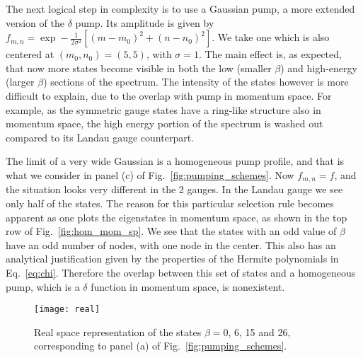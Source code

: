 \documentclass[twocolumn, 10pt, aps, superscriptaddress, floatfix, showpacs, pra, citeautoscript]{revtex4-1}
\newcommand{\co}[2]{#2}
\renewcommand{\paragraph}{\co}
\begin{document}
\paragraph{Gaussian pumping is now bound also in momentum space.}
The next logical step in complexity is to use a Gaussian pump, a more
extended version of the $\delta$ pump. Its amplitude is given by
$f_{m,n} = \exp- \frac{1}{2\sigma^2} \left[(m-m_0)^2 + (n-n_0)^2
\right]$.
We take one which is also centered at $(m_0,n_0) = (5,5)$, with
$\sigma =1$. The main effect is, as expected, that now more states
become visible in both the low (smaller $\beta$) and high-energy
(larger $\beta$) sections of the spectrum. The intensity of the states
however is more difficult to explain, due to the overlap with pump in
momentum space. For example, as the symmetric gauge states have a
ring-like structure also in momentum space, the high energy portion of
the spectrum is washed out compared to its Landau gauge counterpart.

\paragraph{Homogeneous spectrum can be understood using a parity argument in momentum space.}
The limit of a very wide Gaussian is a homogeneous pump profile, and
that is what we consider in panel (c) of
Fig.~\ref{fig:pumping_schemes}. Now $f_{m,n} = f$, and the situation
looks very different in the 2 gauges.  In the Landau gauge we see only
half of the states. The reason for this particular selection rule
becomes apparent as one plots the eigenstates in momentum space, as
shown in the top row of Fig.~\ref{fig:hom_mom_sp}. We see that the
states with an odd value of $\beta$ have an odd number of nodes, with
one node in the center. This also has an analytical justification
given by the properties of the Hermite polynomials in
Eq.~\eqref{eq:chi}. Therefore the overlap between this set of states
and a homogeneous pump, which is a $\delta$ function in momentum
space, is nonexistent. 
%
\begin{figure}[htb]
  \centering
  \texttt{[image: real]} %
  \caption{Real space representation of the states $\beta=0$, 6, 15
    and 26, corresponding to panel (a) of
    Fig.~\ref{fig:pumping_schemes}.}
  \label{fig:delta_real_sp}
\end{figure}
\end{document}
